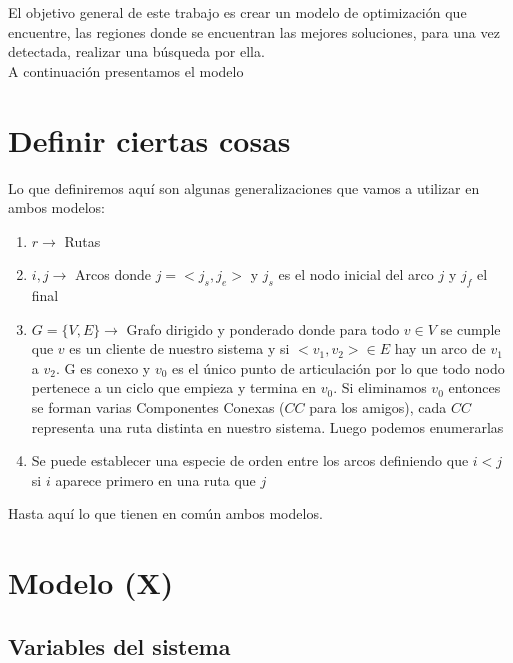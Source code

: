 \documentclass{report}
\begin{document}
El objetivo general de este trabajo es crear un modelo de optimización que encuentre, las regiones donde se encuentran las mejores soluciones, para una vez detectada, realizar una búsqueda por ella.\\
A continuación presentamos el modelo
\section {Definir ciertas cosas}

Lo que definiremos aquí son algunas generalizaciones que vamos a utilizar en ambos modelos:

\begin{enumerate}
\item {$ r \rightarrow $ Rutas}

\item {$i,j \rightarrow$ Arcos donde $j=<j_s,j_e>$ y $j_s$ es el nodo inicial del arco $j$ y $j_f$ el final}

\item {$G=\{V,E\} \rightarrow$ Grafo dirigido y ponderado donde para todo $v \in V$ se cumple que $v$ es un cliente de nuestro sistema y si $<v_1,v_2> \in E$
hay un arco de $v_1$ a $v_2$. G es conexo y $v_0$ es el único punto de articulación  por lo que todo nodo pertenece a un ciclo que empieza y termina en $v_0$. Si eliminamos $v_0$ entonces se forman varias Componentes Conexas ($CC$ para los amigos), cada $CC$ representa una ruta distinta en nuestro sistema. Luego podemos enumerarlas}

\item {Se puede establecer una especie de orden entre los arcos definiendo que $i<j$ si $i$ aparece primero en una ruta que $j$}

\end{enumerate}

Hasta aquí lo que tienen en común ambos modelos. 
\section {Modelo (X)}

\subsection{Variables del sistema}
\end{document}

